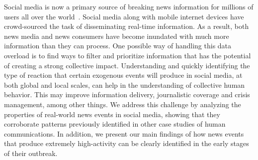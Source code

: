 Social media is now a primary source of breaking news information for millions
of users all over the
world~\cite{Kwak:2010,petrovic2013can,broersma2013twitter,tandoc2016most,Rogers:2013:DTT:2464464.2464511}.
%
Social media along with mobile internet devices have crowd-sourced the
task of disseminating real-time information. 
%
As a result, both news media and news consumers have become inundated with much
more information than they can process. 
%
One possible way of handling this data overload is to find ways to filter and
prioritize information that has the potential of creating a strong collective
impact. 
%
Understanding and quickly identifying the type of reaction that certain
exogenous events will produce in social media, at both global and
local scales, can help in the understanding of collective human behavior.
%
This may improve information delivery, journalistic coverage and
crisis management, among other things. 
%
We address this challenge by analyzing the properties of real-world news events
in social media, showing that they corroborate patterns previously identified in
other case studies of human communications. 
%
In addition, we present our main findings of how news events that produce
extremely high-activity can be clearly identified in the early stages of their
outbreak.




